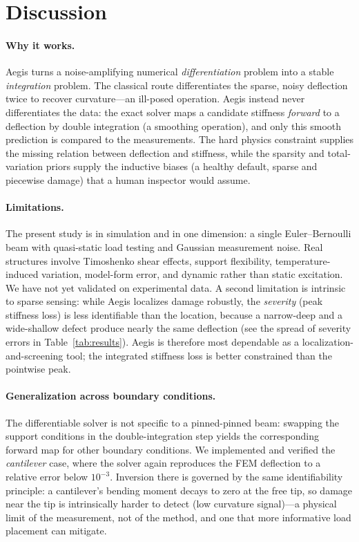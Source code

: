 \documentclass[11pt]{article}
\begin{document}
\section{Discussion}
\paragraph{Why it works.} Aegis turns a noise-amplifying numerical
\emph{differentiation} problem into a stable \emph{integration} problem. The
classical route differentiates the sparse, noisy deflection twice to recover
curvature---an ill-posed operation. Aegis instead never differentiates the data:
the exact solver maps a candidate stiffness \emph{forward} to a deflection by
double integration (a smoothing operation), and only this smooth prediction is
compared to the measurements. The hard physics constraint supplies the missing
relation between deflection and stiffness, while the sparsity and total-variation
priors supply the inductive biases (a healthy default, sparse and piecewise
damage) that a human inspector would assume.

\paragraph{Limitations.} The present study is in simulation and in one dimension:
a single Euler--Bernoulli beam with quasi-static load testing and Gaussian
measurement noise. Real structures involve Timoshenko shear effects, support
flexibility, temperature-induced variation, model-form error, and dynamic rather
than static excitation. We have not yet validated on experimental data. A second
limitation is intrinsic to sparse sensing: while Aegis localizes damage robustly,
the \emph{severity} (peak stiffness loss) is less identifiable than the location,
because a narrow-deep and a wide-shallow defect produce nearly the same deflection
(see the spread of severity errors in Table~\ref{tab:results}). Aegis is therefore
most dependable as a localization-and-screening tool; the integrated stiffness loss
is better constrained than the pointwise peak.

\paragraph{Generalization across boundary conditions.} The differentiable solver is
not specific to a pinned-pinned beam: swapping the support conditions in the
double-integration step yields the corresponding forward map for other boundary
conditions. We implemented and verified the \emph{cantilever} case, where the solver
again reproduces the FEM deflection to a relative error below $10^{-3}$. Inversion
there is governed by the same identifiability principle: a cantilever's bending
moment decays to zero at the free tip, so damage near the tip is intrinsically
harder to detect (low curvature signal)---a physical limit of the measurement, not
of the method, and one that more informative load placement can mitigate.
\end{document}
